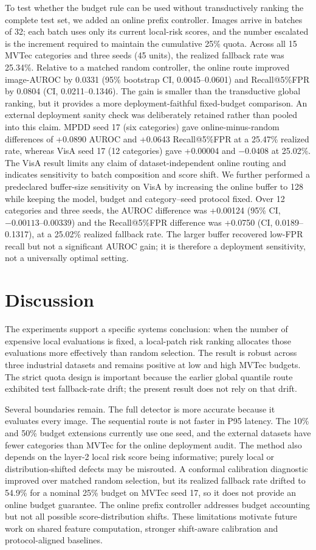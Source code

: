\documentclass[preprint,12pt]{elsarticle}
\begin{document}
To test whether the budget rule can be used without transductively ranking the complete test set, we added an online prefix controller. Images arrive in batches of 32; each batch uses only its current local-risk scores, and the number escalated is the increment required to maintain the cumulative 25\% quota. Across all 15 MVTec categories and three seeds (45 units), the realized fallback rate was 25.34\%. Relative to a matched random controller, the online route improved image-AUROC by 0.0331 (95\% bootstrap CI, 0.0045--0.0601) and Recall@5\%FPR by 0.0804 (CI, 0.0211--0.1346). The gain is smaller than the transductive global ranking, but it provides a more deployment-faithful fixed-budget comparison.
An external deployment sanity check was deliberately retained rather than pooled into this claim. MPDD seed 17 (six categories) gave online-minus-random differences of +0.0890 AUROC and +0.0643 Recall@5\%FPR at a 25.47\% realized rate, whereas VisA seed 17 (12 categories) gave +0.00004 and $-0.0408$ at 25.02\%. The VisA result limits any claim of dataset-independent online routing and indicates sensitivity to batch composition and score shift.
We further performed a predeclared buffer-size sensitivity on VisA by increasing the online buffer to 128 while keeping the model, budget and category--seed protocol fixed. Over 12 categories and three seeds, the AUROC difference was +0.00124 (95\% CI, $-0.00113$--0.00339) and the Recall@5\%FPR difference was +0.0750 (CI, 0.0189--0.1317), at a 25.02\% realized fallback rate. The larger buffer recovered low-FPR recall but not a significant AUROC gain; it is therefore a deployment sensitivity, not a universally optimal setting.

\section{Discussion}
The experiments support a specific systems conclusion: when the number of expensive local evaluations is fixed, a local-patch risk ranking allocates those evaluations more effectively than random selection. The result is robust across three industrial datasets and remains positive at low and high MVTec budgets. The strict quota design is important because the earlier global quantile route exhibited test fallback-rate drift; the present result does not rely on that drift.

Several boundaries remain. The full detector is more accurate because it evaluates every image. The sequential route is not faster in P95 latency. The 10\% and 50\% budget extensions currently use one seed, and the external datasets have fewer categories than MVTec for the online deployment audit. The method also depends on the layer-2 local risk score being informative; purely local or distribution-shifted defects may be misrouted. A conformal calibration diagnostic improved over matched random selection, but its realized fallback rate drifted to 54.9\% for a nominal 25\% budget on MVTec seed 17, so it does not provide an online budget guarantee. The online prefix controller addresses budget accounting but not all possible score-distribution shifts. These limitations motivate future work on shared feature computation, stronger shift-aware calibration and protocol-aligned baselines.
\end{document}

